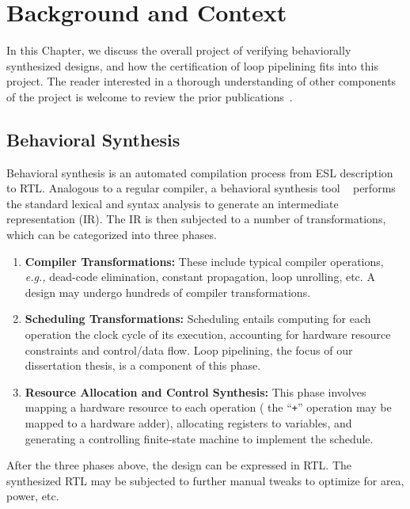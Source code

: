 \chapter{Background and Context}
\label{sec:background}

In this Chapter, we discuss the overall project of verifying behaviorally synthesized
designs, and how the certification of loop pipelining fits into
this project.  The reader interested in a thorough understanding of other
components of the project is welcome to review the prior
publications~\cite{rhcxy:atva-09,hxry:date-10}.

\section{Behavioral Synthesis}


Behavioral synthesis is an automated compilation process from
ESL description to RTL. Analogous to a regular compiler,
a behavioral synthesis tool ~\cite{spark,xpilot,legup} performs
the standard lexical and syntax analysis to generate an intermediate
representation (IR). The IR is then subjected to a number of
transformations, which can be categorized into three phases.

 \begin{enumerate}[--]
\item {\bf Compiler Transformations:} These include typical
  compiler operations, {\em e.g.,} dead-code elimination,
  constant propagation, loop unrolling, etc.  A design may
  undergo hundreds of compiler transformations.
\item {\bf Scheduling Transformations:} Scheduling entails
  computing for each operation the clock cycle of its
  execution, accounting for hardware resource constraints
  and control/data flow.  Loop pipelining, the focus of our
  dissertation thesis, is a component of this phase.
\item {\bf Resource Allocation and Control Synthesis:} This phase
  involves mapping a hardware resource to each operation (%
the
  ``{\tt +}'' operation may be mapped to a hardware adder), allocating
  registers to variables, and generating a controlling finite-state
  machine to implement the schedule.
\end{enumerate}
After the three phases above, the design can be expressed in
RTL.  The synthesized RTL may be subjected to further manual
tweaks to optimize for area, power, etc.

